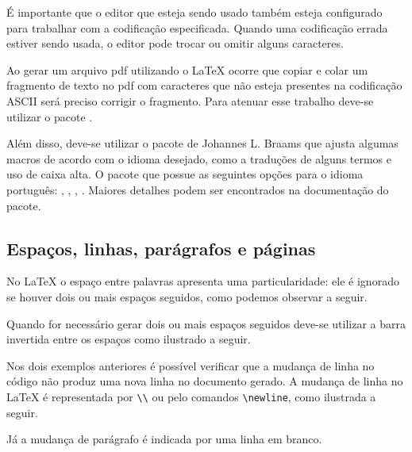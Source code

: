 É importante que o editor que esteja sendo usado também esteja configurado para trabalhar com a codificação especificada. Quando uma codificação errada estiver sendo usada, o editor pode trocar ou omitir alguns caracteres.

Ao gerar um arquivo pdf utilizando o LaTeX ocorre que copiar e colar um fragmento de texto no pdf com caracteres que n\~{a}o esteja presentes na codifica\c{c}\~{a}o ASCII ser\'{a} preciso corrigir o fragmento. Para atenuar esse trabalho deve-se utilizar o pacote .

Al\'{e}m disso, deve-se utilizar o pacote  de Johannes L. Braams que ajusta algumas macros de acordo com o idioma desejado, como a traduções de alguns termos e uso de caixa alta. O pacote  que possue as seguintes opções para o idioma português: , , , . Maiores detalhes podem ser encontrados na documenta\c{c}\~{a}o do pacote\cite{Braams:2008:Babel}.

\subsection{Espaços, linhas, parágrafos e páginas} \label{sss:basic:space}
No LaTeX o espaço entre palavras apresenta uma particularidade: ele \'{e} ignorado se houver dois ou mais espaços seguidos, como podemos observar a seguir. \\

Quando for necessário gerar dois ou mais espaços seguidos deve-se utilizar a barra invertida entre os espaços como ilustrado a seguir. \\

Nos dois exemplos anteriores é possível verificar que a mudança de linha no código não produz uma nova linha no documento gerado. A mudança de linha no LaTeX é representada por \lstinline!\\! ou pelo comandos \lstinline!\newline!, como ilustrada a seguir. \\

Já a mudança de parágrafo é indicada por uma linha em branco. 

